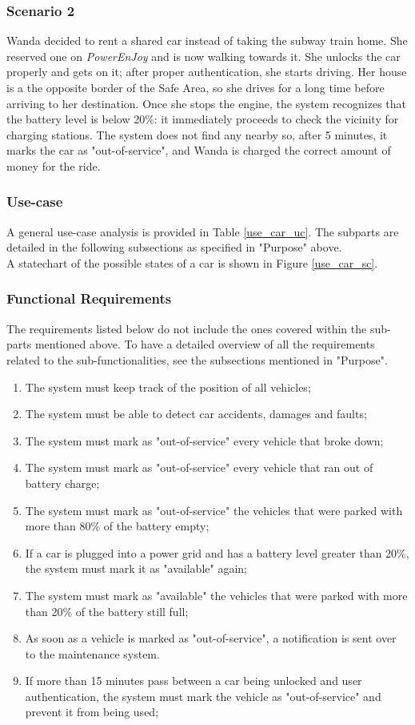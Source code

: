 \subsubsection{Scenario 2}
Wanda decided to rent a shared car instead of taking the subway train home. She reserved one on \emph{PowerEnJoy} and is now walking towards it. She unlocks the car properly and gets on it; after proper authentication, she starts driving. Her house is a the opposite border of the Safe Area, so she drives for a long time before arriving to her destination. Once she stops the engine, the system recognizes that the battery level is below 20\%: it immediately proceeds to check the vicinity for charging stations. The system does not find any nearby so, after 5 minutes, it marks the car as "out-of-service", and Wanda is charged the correct amount of money for the ride.

\subsubsection{Use-case}
A general use-case analysis is provided in Table \ref{use_car_uc}. The subparts are detailed in the following subsections as specified in "Purpose" above. \\
A statechart of the possible states of a car is shown in Figure \ref{use_car_sc}.

\subsubsection{Functional Requirements}
The requirements listed below do not include the ones covered within the sub-parts mentioned above. To have a detailed overview of all the requirements related to the sub-functionalities, see the subsections mentioned in "Purpose".

\begin{enumerate}
\item The system must keep track of the position of all vehicles;
\item The system must be able to detect car accidents, damages and faults;
\item The system must mark as "out-of-service" every vehicle that broke down;
\item The system must mark as "out-of-service" every vehicle that ran out of battery charge;
\item The system must mark as "out-of-service" the vehicles that were parked with more than 80\% of the battery empty;
\item If a car is plugged into a power grid and has a battery level greater than 20\%, the system must mark it as "available" again;
\item The system must mark as "available" the vehicles that were parked with more than 20\% of the battery still full;
\item As soon as a vehicle is marked as "out-of-service", a notification is sent over to the maintenance system.
\item If more than 15 minutes pass between a car being unlocked and user authentication, the system must mark the vehicle as "out-of-service" and prevent it from being used;
\end{enumerate}

